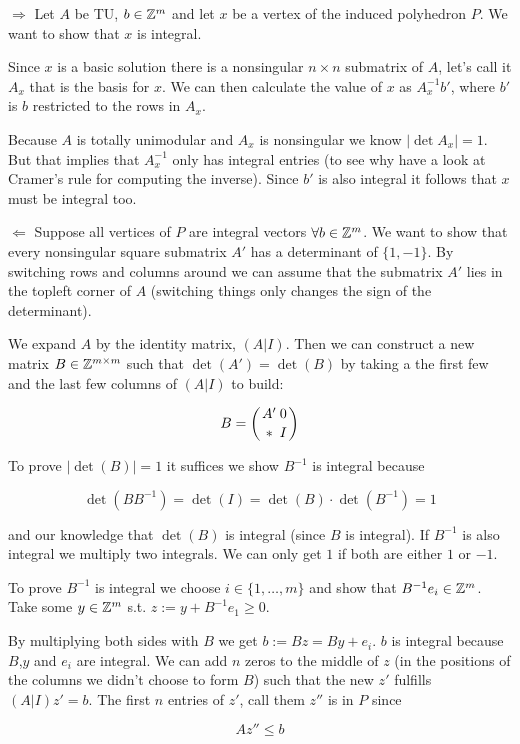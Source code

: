 \begin{pr} $\Rightarrow$ Let $A$ be TU, $b\in \mathbb{Z}^m$ and let $x$ be a vertex of the induced polyhedron $P$. We want to show that $x$ is integral.

Since $x$ is a basic solution there is a nonsingular $n\times n$ submatrix of $A$, let's call it $A_x$ that is the basis for $x$. We can then calculate the value of $x$ as $A_x^{-1}b'$, where $b'$ is $b$ restricted to the rows in $A_x$. 

Because $A$ is totally unimodular and $A_x$ is nonsingular we know $|\det A_x|=1$. But that implies that $A_x^{-1}$ only has integral entries (to see why have a look at Cramer's rule for computing the inverse). Since $b'$ is also integral it follows that $x$ must be integral too.

$\Leftarrow$ Suppose all vertices of $P$ are integral vectors $\forall b\in \mathbb{Z}^m$. We want to show that every nonsingular square submatrix $A'$ has a determinant of $\{1,-1\}$. By switching rows and columns around we can assume that the submatrix $A'$ lies in the topleft corner of $A$ (switching things only changes the sign of the determinant). 

We expand $A$ by the identity matrix, $(A|I)$. Then we can construct a new matrix $B\in \mathbb{Z}^{m\times m}$ such that $\det (A') = \det (B)$ by taking a the first few and the last few columns of $(A|I)$ to build:

\[B = \left({A' \atop *} {0\atop I}\right)\]

To prove $|\det (B)| =1$ it suffices we show $B^{-1}$ is integral because

\[\det(BB^{-1}) = \det(I) = \det(B)\cdot\det(B^{-1}) = 1\]

and our knowledge that $\det (B)$ is integral (since $B$ is integral). If $B^{-1}$ is also integral we multiply two integrals. We can only get $1$ if both are either $1$ or $-1$.

To prove $B^{-1}$ is integral we choose $i\in \{1,\ldots, m\}$ and show that $B^{-1}e_i\in \mathbb{Z}^m$. Take some $y\in \mathbb{Z}^m$ s.t. $z:= y + B^{-1}e_1\geq 0$. 

By multiplying both sides with $B$ we get $b:= Bz=By+e_i$. $b$ is integral because $B$,$y$ and $e_i$ are integral. We can add $n$ zeros to the middle of $z$ (in the positions of the columns we didn't choose to form $B$) such that the new $z'$ fulfills $(A|I)z'=b$. The first $n$ entries of $z'$, call them $z''$ is in $P$ since

\[Az''\leq b\]


\end{pr}
